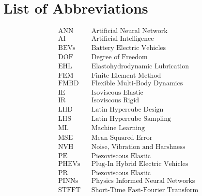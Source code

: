 
\chapter*{List of Abbreviations}
\begin{align*}
	&\text{ANN} &&\text{Artificial Neural Network}\\
	&\text{AI} &&\text{Artificial Intelligence}\\
	&\text{BEVs} &&\text{Battery Electric Vehicles}\\
	&\text{DOF} &&\text{Degree of Freedom}\\
	&\text{EHL} &&\text{Elastohydrodynamic Lubrication}\\
	&\text{FEM} &&\text{Finite Element Method}\\
	&\text{FMBD} &&\text{Flexible Multi-Body Dynamics}\\
	&\text{IE} &&\text{Isoviscous Elastic}\\
	&\text{IR} &&\text{Isoviscous Rigid}\\
	&\text{LHD} &&\text{Latin Hypercube Design}\\
	&\text{LHS} &&\text{Latin Hypercube Sampling}\\
	&\text{ML} &&\text{Machine Learning}\\
	&\text{MSE} &&\text{Mean Squared Error}\\
	&\text{NVH} &&\text{Noise, Vibration and Harshness}\\
	&\text{PE} &&\text{Piezoviscous Elastic}\\
	&\text{PHEVs} &&\text{Plug-In Hybrid Electric Vehicles}\\
	&\text{PR} &&\text{Piezoviscous Elastic}\\
	&\text{PINNs} &&\text{Physics Informed Neural Networks}\\
	&\text{STFFT} &&\text{Short-Time Fast-Fourier Transform}\\
\end{align*}
